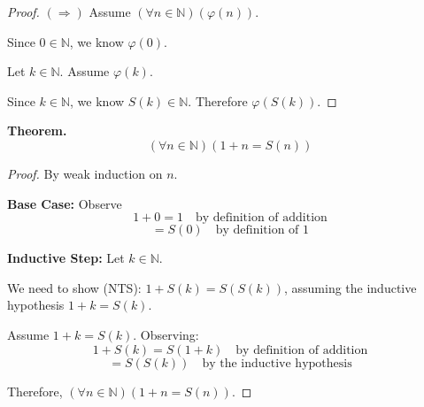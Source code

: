 \documentclass[12pt]{article}
\theoremstyle{proofstyle}
\begin{document}
\begin{proof}[Proof]
\medskip
\noindent$(\Rightarrow)$ Assume $(\forall n \in \mathbb{N})(\varphi(n))$.

Since $0 \in \mathbb{N}$, we know $\varphi(0)$.

Let $k \in \mathbb{N}$. Assume $\varphi(k)$.

Since $k \in \mathbb{N}$, we know $S(k) \in \mathbb{N}$. Therefore $\varphi(S(k))$.

\end{proof}

\bigskip
\noindent\textbf{Theorem.}
\[
(\forall n \in \mathbb{N})(1 + n = S(n))
\]

\begin{proof}[Proof]
By weak induction on $n$.

\medskip
\noindent\textbf{Base Case:} Observe
\[
1 + 0 = 1 \quad \text{by definition of addition}
\]
\[
= S(0) \quad \text{by definition of } 1
\]

\medskip
\noindent\textbf{Inductive Step:} Let $k \in \mathbb{N}$.

\noindent We need to show (NTS): $1 + S(k) = S(S(k))$, assuming the inductive hypothesis $1 + k = S(k)$.

\medskip
Assume $1 + k = S(k)$. Observing:
\[
1 + S(k) = S(1 + k) \quad \text{by definition of addition}
\]
\[
= S(S(k)) \quad \text{by the inductive hypothesis}
\]

Therefore, $(\forall n \in \mathbb{N})(1 + n = S(n))$.

\end{proof}
\end{document}
